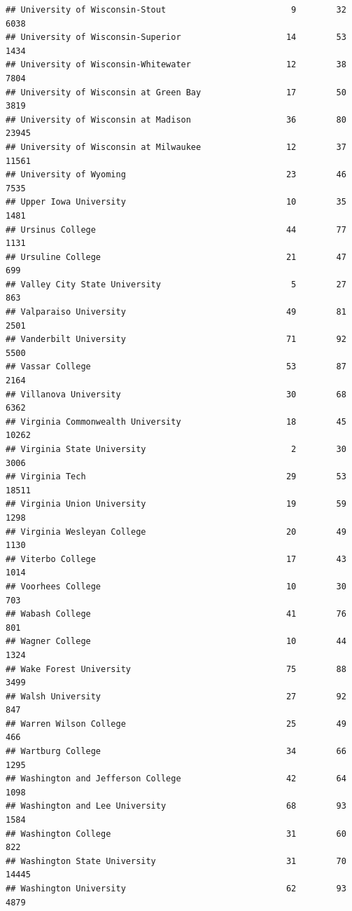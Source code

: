\documentclass[
]{article}
\begin{document}
\begin{verbatim}
## University of Wisconsin-Stout                         9        32        6038
## University of Wisconsin-Superior                     14        53        1434
## University of Wisconsin-Whitewater                   12        38        7804
## University of Wisconsin at Green Bay                 17        50        3819
## University of Wisconsin at Madison                   36        80       23945
## University of Wisconsin at Milwaukee                 12        37       11561
## University of Wyoming                                23        46        7535
## Upper Iowa University                                10        35        1481
## Ursinus College                                      44        77        1131
## Ursuline College                                     21        47         699
## Valley City State University                          5        27         863
## Valparaiso University                                49        81        2501
## Vanderbilt University                                71        92        5500
## Vassar College                                       53        87        2164
## Villanova University                                 30        68        6362
## Virginia Commonwealth University                     18        45       10262
## Virginia State University                             2        30        3006
## Virginia Tech                                        29        53       18511
## Virginia Union University                            19        59        1298
## Virginia Wesleyan College                            20        49        1130
## Viterbo College                                      17        43        1014
## Voorhees College                                     10        30         703
## Wabash College                                       41        76         801
## Wagner College                                       10        44        1324
## Wake Forest University                               75        88        3499
## Walsh University                                     27        92         847
## Warren Wilson College                                25        49         466
## Wartburg College                                     34        66        1295
## Washington and Jefferson College                     42        64        1098
## Washington and Lee University                        68        93        1584
## Washington College                                   31        60         822
## Washington State University                          31        70       14445
## Washington University                                62        93        4879

\end{verbatim}
\end{document}
